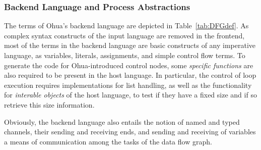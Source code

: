 \subsubsection{Backend Language and Process Abstractions}
\label{subsec:BackendRequirements}
The terms of Ohua's backend language are depicted in Table~\ref{tab:DFGdef}. As complex syntax constructs of the input language are removed in the frontend, most of the terms in the backend language are basic constructs of any imperative language, as variables, literals, assignments, and simple control flow terms. To generate the code for Ohua-introduced control nodes, some \emph{specific functions} are also required to be present in the host language. In particular, the control of loop execution requires implementations for list handling, as well as the functionality for \emph{interable objects} of the host language, to test if they have a fixed size and if so retrieve this size information. 

Obviously, the backend language also entails the notion of named and typed channels, their sending and receiving ends, and sending and receiving of variables a means of communication among the tasks of the data flow graph. 

